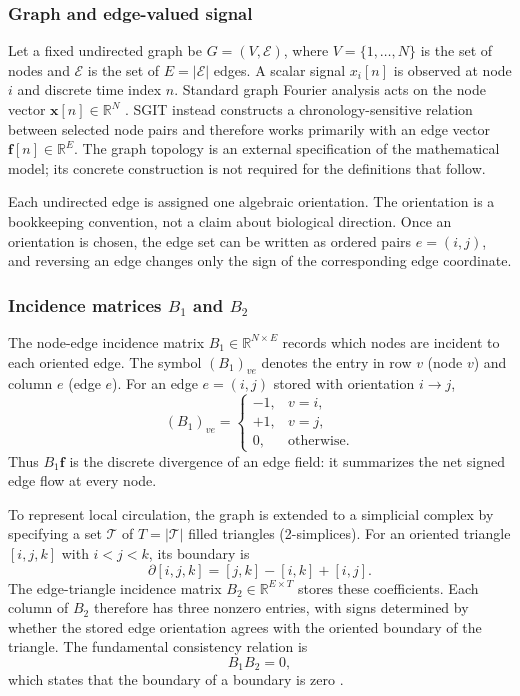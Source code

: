 \documentclass[12pt]{article}
\newcommand{\R}{\mathbb{R}}
\begin{document}
\subsubsection{Graph and edge-valued signal}
Let a fixed undirected graph be $G=(V,\mathcal E)$, where $V=\{1,\ldots,N\}$ is the set of nodes and $\mathcal E$ is the set of $E=|\mathcal E|$ edges. A scalar signal $x_i[n]$ is observed at node $i$ and discrete time index $n$. Standard graph Fourier analysis acts on the node vector $\bm x[n]\in\R^N$ \citep{Shuman2013}. SGIT instead constructs a chronology-sensitive relation between selected node pairs and therefore works primarily with an edge vector $\bm f[n]\in\R^E$. The graph topology is an external specification of the mathematical model; its concrete construction is not required for the definitions that follow.

Each undirected edge is assigned one algebraic orientation. The orientation is a bookkeeping convention, not a claim about biological direction. Once an orientation is chosen, the edge set can be written as ordered pairs $e=(i,j)$, and reversing an edge changes only the sign of the corresponding edge coordinate.

\subsubsection{Incidence matrices $B_1$ and $B_2$}
The node-edge incidence matrix $B_1\in\R^{N\times E}$ records which nodes are incident to each oriented edge. The symbol $(B_1)_{ve}$ denotes the entry in row $v$ (node $v$) and column $e$ (edge $e$). For an edge $e=(i,j)$ stored with orientation $i\rightarrow j$,
\begin{equation}
(B_1)_{ve}=\begin{cases}
-1,&v=i,\\
+1,&v=j,\\
0,&\text{otherwise}.
\end{cases}
\label{eq:B1}
\end{equation}
Thus $B_1\bm f$ is the discrete divergence of an edge field: it summarizes the net signed edge flow at every node.

To represent local circulation, the graph is extended to a simplicial complex by specifying a set $\mathcal T$ of $T=|\mathcal T|$ filled triangles (2-simplices). For an oriented triangle $[i,j,k]$ with $i<j<k$, its boundary is
\begin{equation}
\partial[i,j,k]=[j,k]-[i,k]+[i,j].
\label{eq:triangleboundary}
\end{equation}
The edge-triangle incidence matrix $B_2\in\R^{E\times T}$ stores these coefficients. Each column of $B_2$ therefore has three nonzero entries, with signs determined by whether the stored edge orientation agrees with the oriented boundary of the triangle. The fundamental consistency relation is
\begin{equation}
B_1B_2=0,
\label{eq:boundaryzero}
\end{equation}
which states that the boundary of a boundary is zero \citep{Jiang2011,Schaub2021}.
\end{document}
